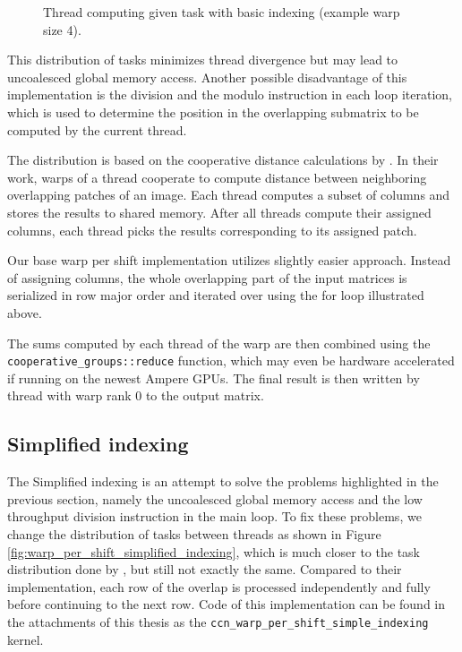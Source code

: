 \begin{figure}[ht]
	\centering
	\def\svgwidth{0.5\textwidth}
	\fontsize{8}{10}\selectfont
	
	\caption{Thread computing given task with basic indexing (example warp size 4).}
	\label{fig:warp_per_shift_normal_indexing}
\end{figure}

This distribution of tasks minimizes thread divergence but may lead to uncoalesced global memory access. Another possible disadvantage of this implementation is the division and the modulo instruction in each loop iteration, which is used to determine the position in the overlapping submatrix to be computed by the current thread.

The distribution is based on the cooperative distance calculations by \citet{paper:krulis_3d_block}. In their work, warps of a thread cooperate to compute distance between neighboring overlapping patches of an image. Each thread computes a subset of columns and stores the results to shared memory. After all threads compute their assigned columns, each thread picks the results corresponding to its assigned patch. 

Our base warp per shift implementation utilizes slightly easier approach. Instead of assigning columns, the whole overlapping part of the input matrices is serialized in row major order and iterated over using the for loop illustrated above. 

The sums computed by each thread of the warp are then combined using the \texttt{cooperative\_groups::reduce} function, which may even be hardware accelerated if running on the newest Ampere GPUs. The final result is then written by thread with warp rank $0$ to the output matrix. 


\subsection{Simplified indexing}
\label{sec:simplified_indexing}

The Simplified indexing is an attempt to solve the problems highlighted in the previous section, namely the uncoalesced global memory access and the low throughput division instruction in the main loop. To fix these problems, we change the distribution of tasks between threads as shown in Figure \ref{fig:warp_per_shift_simplified_indexing}, which is much closer to the task distribution done by \citet{paper:krulis_3d_block}, but still not exactly the same. Compared to their implementation, each row of the overlap is processed independently and fully before continuing to the next row. Code of this implementation can be found in the attachments of this thesis as the \texttt{ccn\_warp\_per\_shift\_simple\_indexing} kernel.

